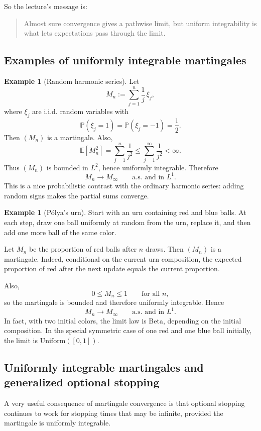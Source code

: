 \documentclass[11pt]{article}
\theoremstyle{definition}
\newtheorem{example}[theorem]{Example}
\begin{document}
So the lecture's message is:
\begin{quote}
Almost sure convergence gives a pathwise limit, but uniform integrability is what lets expectations pass through the limit.
\end{quote}

\subsection{Examples of uniformly integrable martingales}

\begin{example}[Random harmonic series]
Let
\[
M_n := \sum_{j=1}^n \frac{1}{j}\,\xi_j,
\]
where \(\xi_j\) are i.i.d. random variables with
\[
\mathbb P(\xi_j=1)=\mathbb P(\xi_j=-1)=\frac12.
\]
Then \((M_n)\) is a martingale. Also,
\[
\mathbb E[M_n^2] = \sum_{j=1}^n \frac{1}{j^2}
\le \sum_{j=1}^\infty \frac{1}{j^2} < \infty.
\]
Thus \((M_n)\) is bounded in \(L^2\), hence uniformly integrable. Therefore
\[
M_n \to M_\infty
\qquad \text{a.s. and in } L^1.
\]
This is a nice probabilistic contrast with the ordinary harmonic series: adding random signs makes the partial sums converge.
\end{example}

\begin{example}[P\'olya's urn]
Start with an urn containing red and blue balls. At each step, draw one ball uniformly at random from the urn, replace it, and then add one more ball of the same color.

Let \(M_n\) be the proportion of red balls after \(n\) draws. Then \((M_n)\) is a martingale. Indeed, conditional on the current urn composition, the expected proportion of red after the next update equals the current proportion.

Also,
\[
0\le M_n\le 1
\qquad \text{for all } n,
\]
so the martingale is bounded and therefore uniformly integrable. Hence
\[
M_n \to M_\infty
\qquad \text{a.s. and in } L^1.
\]
In fact, with two initial colors, the limit law is Beta, depending on the initial composition. In the special symmetric case of one red and one blue ball initially, the limit is $\mathrm{Uniform}([0,1])$.
\end{example}

\subsection{Uniformly integrable martingales and generalized optional stopping}

A very useful consequence of martingale convergence is that optional stopping continues to work for stopping times that may be infinite, provided the martingale is uniformly integrable.
\end{document}
